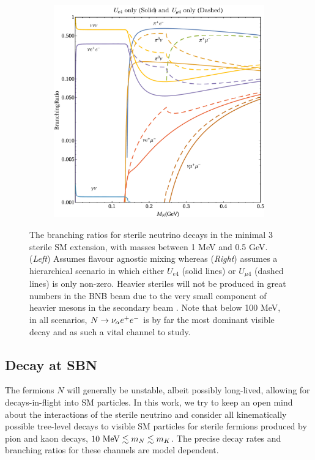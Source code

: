 \documentclass[11pt, a4paper]{article}
\def\ster{\ensuremath N}
\begin{document}
\begin{figure}[t]
\begin{subfigure}{.5\textwidth}
\includegraphics[width=\linewidth]{figures/BR_notlog_square2.pdf}
\end{subfigure}

\caption{\label{fig:branchingratios}The branching ratios for sterile neutrino
decays in the minimal 3 sterile SM extension, with masses between 1 MeV and 0.5
GeV. (\emph{Left}) Assumes flavour agnostic mixing whereas (\emph{Right}) assumes a
hierarchical scenario in which either $U_{e4}$ (solid lines) or $U_{\mu 4}$
(dashed lines) is only non-zero. Heavier steriles will not be produced in great
numbers in the BNB beam due to the very small component of heavier mesons in
the secondary beam \cite{AguilarArevalo:2008yp}. Note that below 100 MeV, in
all scenarios, $\ster \rightarrow \nu_\alpha e^+ e^-$ is by far the most
dominant visible decay and as such a vital channel to study.}

\end{figure}
%

\subsection{Decay at SBN}

The fermions $N$ will generally be unstable, albeit possibly long-lived, allowing
for decays-in-flight into SM particles. In this work, we try to keep an open
mind about the interactions of the sterile neutrino and consider all
kinematically possible tree-level decays to visible SM particles for sterile
fermions produced by pion and kaon decays, $10~\text{MeV}\lesssim m_{\ster}
\lesssim m_K$. The precise decay rates and branching ratios for these channels
are model dependent. 
%
\end{document}

